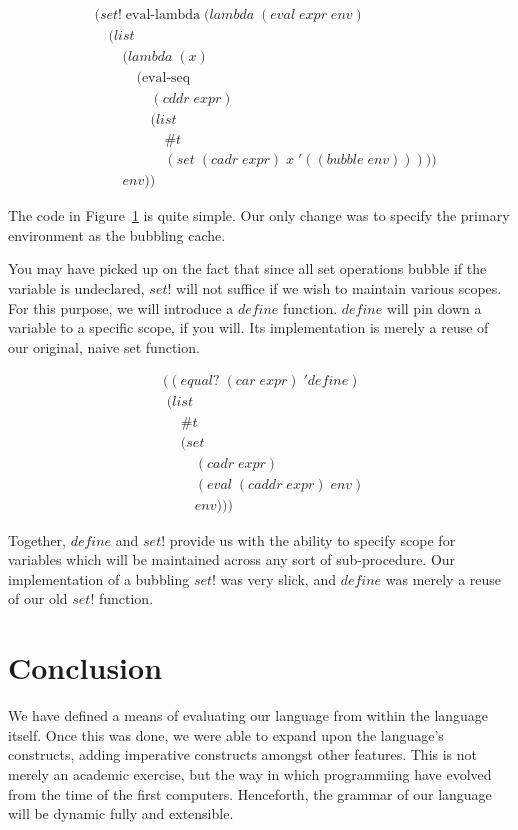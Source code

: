 \begin{figure}[htp]
\caption{}\label{fig:separateBubbleEnv}
\begin{align*}
& (set! \; \text{eval-lambda} \; (lambda \; (eval \; expr \; env)
\\& \quad (list
\\& \qquad (lambda \; (x) \; 
\\& \qquad \quad (\text{eval-seq} \; 
\\& \qquad \qquad (cddr \; expr) \; 
\\& \qquad \qquad (list
\\& \qquad \qquad \quad \#t
\\& \qquad \qquad \quad (set \; (cadr \; expr) \; x \; '((bubble \; env)))))
\\& \qquad env))
\end{align*}
\end{figure}

The code in Figure~\ref{fig:separateBubbleEnv} is quite simple. Our only change
was to specify the primary environment as the bubbling cache.

You may have picked up on the fact that since all set operations bubble if
the variable is undeclared, $set!$ will not suffice if we wish to maintain
various scopes. For this purpose, we will introduce a $define$ function.
$define$ will pin down a variable to a specific scope, if you will. Its
implementation is merely a reuse of our original, naive set function.

\begin{figure}[htp]
\caption{}\label{fig:defineDef}
\begin{align*}
& ((equal? \; (car \; expr) \; 'define)
\\& \; (list \; 
\\& \quad \; \#t \; 
\\& \quad \; (set \; 
\\& \qquad \; (cadr \; expr) \; 
\\& \qquad \; (eval \; (caddr \; expr) \; env) \; 
\\& \qquad \; env)))
\end{align*}
\end{figure}

Together, $define$ and $set!$ provide us with the ability to specify scope
for variables which will be maintained across any sort of sub-procedure. Our
implementation of a bubbling $set!$ was very slick, and $define$ was merely
a reuse of our old $set!$ function.

\section{Conclusion}
We have defined a means of evaluating our language from within the language
itself. Once this was done, we were able to expand upon the language's constructs,
adding imperative constructs amongst other features. This is not merely an
academic exercise, but the way in which programmiing have evolved from the time
of the first computers. Henceforth, the grammar of our language will be dynamic
fully and extensible.
